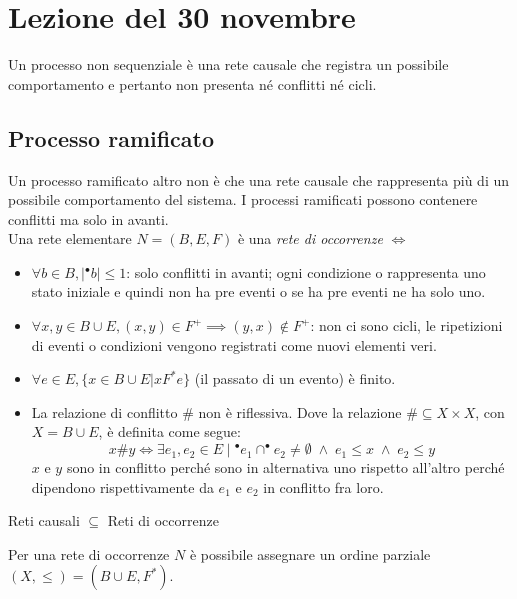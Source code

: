 \section{Lezione del 30 novembre}
Un processo non sequenziale è una rete causale che registra un possibile comportamento e pertanto non presenta né conflitti né cicli.
\subsection{Processo ramificato}
Un processo ramificato altro non è che una rete causale che rappresenta più di un possibile comportamento del sistema. I processi ramificati possono contenere conflitti ma solo in avanti.\\

Una rete elementare $N = (B, E, F)$ è una \textit{rete di occorrenze} $\iff$
\begin{itemize}
    \item $\forall b \in B, |^\bullet b| \leq 1$: solo conflitti in avanti; ogni condizione o rappresenta uno stato iniziale e quindi non ha pre eventi o se ha pre eventi ne ha solo uno.
    \item $\forall x, y \in B \cup E, (x,y) \in F^+ \implies (y,x) \notin F^+$: non ci sono cicli, le ripetizioni di eventi o condizioni vengono registrati come nuovi elementi veri.
    \item $\forall e \in E, \{x \in B \cup E | xF^*e\}$ (il passato di un evento) è finito. 
    \item La relazione di conflitto $\#$ non è riflessiva. Dove la relazione $\# \subseteq X \times X$, con $X = B \cup E$, è definita come segue: 
    \[x \# y \iff \exists e_1, e_2 \in E \; | \; ^\bullet e_1 \cap ^\bullet e_2 \neq \emptyset \; \land \; e_1 \leq x \; \land \; e_2 \leq y\]
    $x$ e $y$ sono in conflitto perché sono in alternativa uno rispetto all’altro perché dipendono rispettivamente da $e_1$ e $e_2$ in conflitto fra loro.
    \end{itemize}
\begin{center}
    Reti causali $\subseteq$ Reti di occorrenze
\end{center}
Per una rete di occorrenze $N$ è possibile assegnare un ordine parziale $(X, \leq) = (B \cup E, F^*)$.\\

